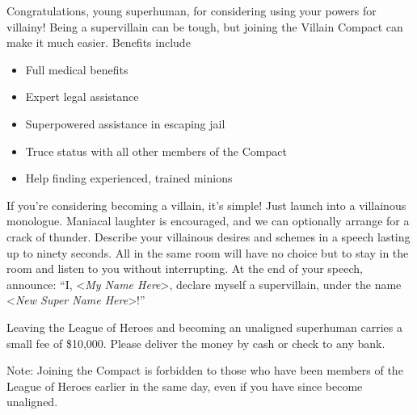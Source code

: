 \documentclass[white]{guildcamp1}
\begin{document}
\name{\wVillainRecruitment{}}

Congratulations, young superhuman, for considering using your powers for villainy!  Being a supervillain can be tough, but joining the Villain Compact can make it much easier.  Benefits include

\begin{itemize}
\item Full medical benefits
\item Expert legal assistance
\item Superpowered assistance in escaping jail
\item Truce status with all other members of the Compact
\item Help finding experienced, trained minions
\end{itemize}

If you're considering becoming a villain, it's simple!  Just launch into a villainous monologue.  Maniacal laughter is encouraged, and we can optionally arrange for a crack of thunder.  Describe your villainous desires and schemes in a speech lasting up to ninety seconds.  All in the same room will have no choice but to stay in the room and listen to you without interrupting.  At the end of your speech, announce: ``I, <\textit{My Name Here}>, declare myself a supervillain, under the name <\textit{New Super Name Here}>!''

Leaving the League of Heroes and becoming an unaligned superhuman carries a small fee of \$10,000.  Please deliver the money by cash or check to any bank.  %

Note: Joining the Compact is forbidden to those who have been members of the League of Heroes earlier in the same day, even if you have since become unaligned.
\end{document}
